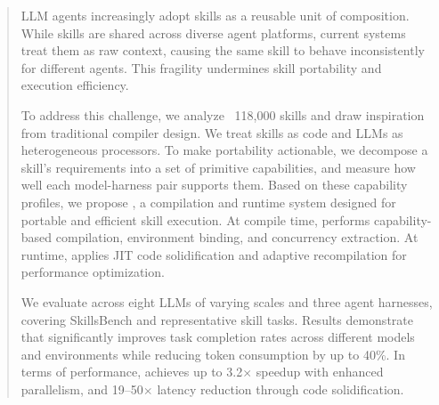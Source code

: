\begin{abstract}
LLM agents increasingly adopt skills as a reusable unit of composition.
While skills are shared across diverse agent platforms, current systems treat them as raw context, causing the same skill to behave inconsistently for different agents.
This fragility undermines skill portability and execution efficiency.

To address this challenge, we analyze ~118,000 skills and draw inspiration from traditional compiler design.
We treat skills as code and LLMs as heterogeneous processors.
To make portability actionable, we decompose a skill's requirements into a set of primitive capabilities,
and measure how well each model-harness pair supports them.
Based on these capability profiles, we propose \sys, a compilation and runtime system designed for portable and efficient skill execution.
At compile time, \sys performs capability-based compilation, environment binding, and concurrency extraction.
At runtime, \sys applies JIT code solidification and adaptive recompilation for performance optimization.

We evaluate \sys across eight LLMs of varying scales and three agent harnesses, covering SkillsBench and representative skill tasks.
Results demonstrate that \sys significantly improves task completion rates across different models and environments while reducing token consumption by up to 40\%.
In terms of performance, \sys achieves up to 3.2$\times$ speedup with enhanced parallelism, and 19--50$\times$ latency
reduction through code solidification.
\end{abstract}

